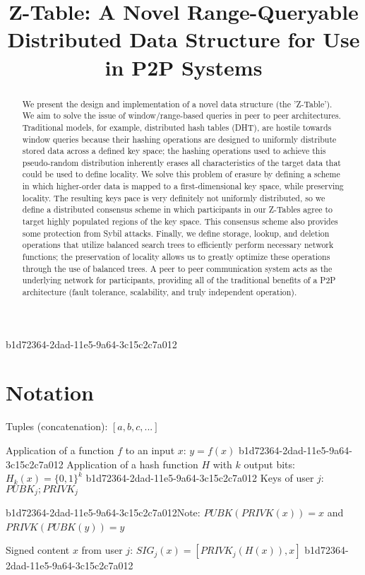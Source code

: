 \documentclass[12pt]{article}
\title{Z-Table: A Novel Range-Queryable Distributed Data Structure for Use in P2P Systems}
\begin{document}
b1d72364-2dad-11e5-9a64-3c15c2c7a012\maketitle

\begin{abstract}
We present the design and implementation of a novel data structure (the 'Z-Table'). We aim to solve the issue of window/range-based queries in peer to peer architectures. Traditional models, for example,  distributed hash tables (DHT), are hostile towards window queries because their hashing operations are designed to uniformly distribute stored data across a defined key space; the hashing operations used to achieve this pseudo-random distribution inherently erases all characteristics of the target data that could be used to define locality. We solve this problem of erasure by defining a scheme in which higher-order data is mapped to a first-dimensional key space, while preserving locality. The resulting keys pace is very definitely not uniformly distributed, so we define a distributed consensus scheme in which participants in our Z-Tables agree to target highly populated regions of the key space. This consensus scheme also provides some protection from Sybil attacks. Finally, we define storage, lookup, and deletion operations that utilize balanced search trees to efficiently perform necessary network functions; the preservation of locality allows us to greatly optimize these operations through the use of balanced trees. A peer to peer communication system acts as the underlying network for participants, providing all of the traditional benefits of a P2P architecture (fault tolerance, scalability, and truly independent operation).
\end{abstract}

\section{Notation}

Tuples (concatenation): $[a,b,c,...]$

Application of a function $f$ to an input $x$: $y=f(x)$
b1d72364-2dad-11e5-9a64-3c15c2c7a012
Application of a hash function $H$ with $k$ output bits: $H_{k}(x) = \{0,1\}^k$
b1d72364-2dad-11e5-9a64-3c15c2c7a012
Keys of user $j$: $ PUBK_j; PRIVK_j $

b1d72364-2dad-11e5-9a64-3c15c2c7a012Note: $PUBK(PRIVK(x)) = x$ and $PRIVK(PUBK(y)) = y$~

Signed content $x$ from user $j$: $SIG_j(x) = \left[ PRIVK_j( H(x) ), x \right]$
b1d72364-2dad-11e5-9a64-3c15c2c7a012
\end{document}
